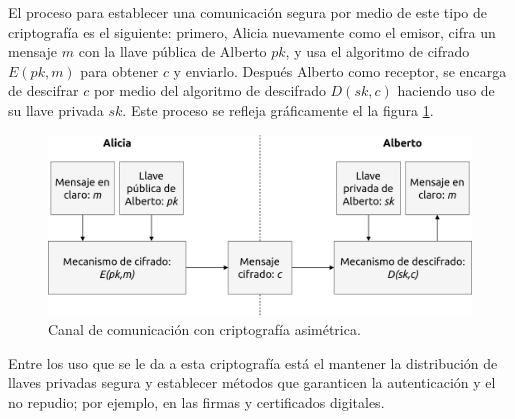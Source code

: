El proceso para establecer una comunicación segura por medio de este tipo
de criptografía es el siguiente: primero, Alicia nuevamente como el emisor,
cifra un mensaje $m$ con la llave pública de Alberto $pk$, y usa el algoritmo de
cifrado $E(pk,m)$ para obtener $c$ y enviarlo. Después Alberto como receptor,
se encarga de descifrar $c$ por medio del algoritmo de descifrado
$D(sk,c)$ haciendo uso de su llave privada $sk$. Este proceso se refleja
gráficamente el la figura \ref{cripto_asimetrica}.

\begin{figure}
  \begin{center}
    \includegraphics[width=0.8\linewidth]{diagramas/cripto_asimetrica.png}
    \caption{Canal de comunicación con criptografía asimétrica.}
    \label{cripto_asimetrica}
  \end{center}
\end{figure}

Entre los uso que se le da a esta criptografía está el mantener la
distribución de llaves privadas segura y establecer métodos que garanticen
la autenticación y el no repudio; por ejemplo, en las firmas y
certificados digitales.



